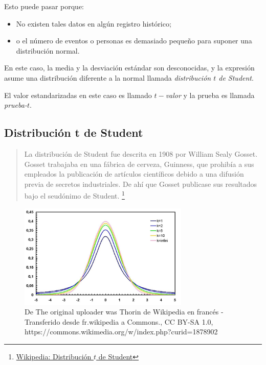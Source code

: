 Esto puede pasar porque:
\begin{itemize}
	\item No existen tales datos en algún registro histórico;
	\item o el número de eventos o personas es demasiado pequeño para suponer una distribución normal.
\end{itemize}


En este caso, la media y la desviación estándar son desconocidas, y la expresión asume una distribución diferente a la normal llamada \emph{distribución $t$ de Student}.



El valor estandarizadas en este caso es llamado \emph{$t-$valor} y la prueba es llamada \emph{prueba-$t$}.


\subsection{Distribución t de Student}
\begin{quote}
	La distribución de Student fue descrita en 1908 por William Sealy Gosset. Gosset trabajaba en una fábrica de cerveza, Guinness, que prohibía a sus empleados la publicación de artículos científicos debido a una difusión previa de secretos industriales. De ahí que Gosset publicase sus resultados bajo el seudónimo de Student. \footnote{
		\href{https://es.wikipedia.org/wiki/Distribuci\%C3\%B3n\_t\_de\_Student\#Historia}{Wikipedia: Distribución $t$ de Student}
	}
\end{quote}


\begin{figure}
	\centering
	\includegraphics[height=5cm,keepaspectratio=true]{./images/Student_densite_best.jpg}
	\caption{De The original uploader was Thorin de Wikipedia en francés - Transferido desde fr.wikipedia a Commons., CC BY-SA 1.0, https://commons.wikimedia.org/w/index.php?curid=1878902}
	\label{fig:tPDF}
\end{figure}




